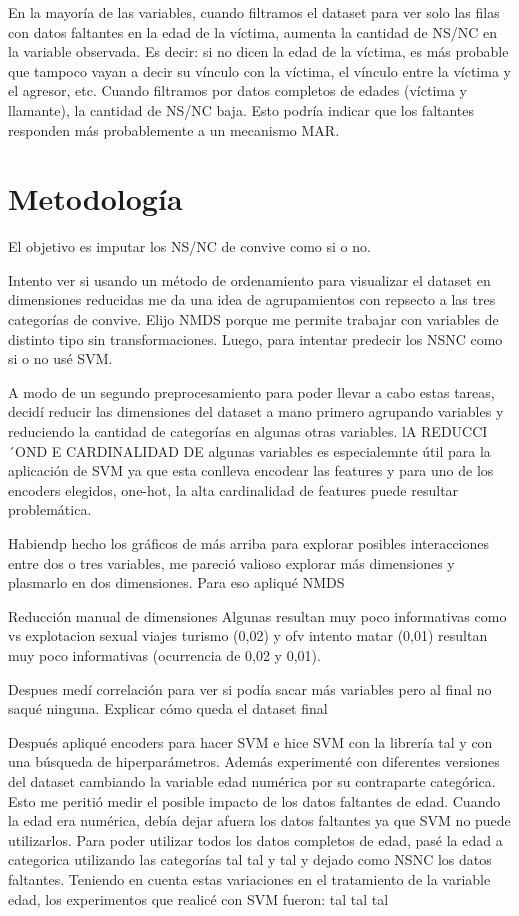 \documentclass[10 pt]{article}
\begin{document}
En la mayoría de las variables, cuando filtramos el dataset para ver solo las filas con datos faltantes en la edad de la víctima, aumenta la cantidad de NS/NC en la variable observada. Es decir: si no dicen la edad de la víctima, es más probable que tampoco vayan a decir su vínculo con la víctima, el vínculo entre la víctima y el agresor, etc. Cuando filtramos por datos completos de edades (víctima y llamante), la cantidad de NS/NC baja. Esto podría indicar que los faltantes responden más probablemente a un mecanismo MAR.






\section*{Metodología}\label{met}

El objetivo es imputar los NS/NC de convive como si o no. 

Intento ver si usando un método de ordenamiento para visualizar el dataset en dimensiones reducidas me da una
idea de agrupamientos con repsecto a las tres categorías de convive. Elijo NMDS porque me permite trabajar con
variables de distinto tipo sin transformaciones.
 Luego, para intentar predecir los NSNC como si o no usé SVM. 

A modo de un segundo preprocesamiento para poder llevar a cabo estas tareas, decidí reducir las dimensiones del dataset a mano primero agrupando variables y reduciendo la cantidad de categorías en algunas otras variables. lA REDUCCI´OND E CARDINALIDAD DE algunas variables es especialemnte útil para la aplicación de SVM ya que esta conlleva encodear las features y para uno de los encoders elegidos, one-hot, la alta cardinalidad de features puede resultar problemática.


Habiendp hecho los gráficos de más arriba para explorar posibles interacciones entre dos o tres variables, me pareció valioso explorar más dimensiones y plasmarlo en dos dimensiones. Para eso apliqué NMDS

Reducción manual de dimensiones
Algunas resultan muy poco informativas como vs explotacion sexual viajes turismo (0,02) y ofv intento matar (0,01) resultan muy poco informativas (ocurrencia de 0,02 y 0,01). 

Despues medí correlación para ver si podía sacar más variables pero al final no saqué ninguna. Explicar cómo queda el dataset final

Después apliqué encoders para hacer SVM e hice SVM con la librería tal y con una búsqueda de hiperparámetros. Además experimenté con diferentes versiones del dataset cambiando la variable edad numérica por su contraparte categórica. Esto me peritió medir el posible impacto de los datos faltantes de edad. Cuando la edad era numérica, debía dejar afuera los datos faltantes ya que SVM no puede utilizarlos. Para poder utilizar todos los datos completos de edad, pasé la edad a categorica  utilizando las categorías tal tal y tal y dejado como NSNC los datos faltantes. Teniendo en cuenta estas variaciones en el tratamiento de la variable edad, los experimentos que realicé con SVM fueron: 
tal tal tal
\end{document}
